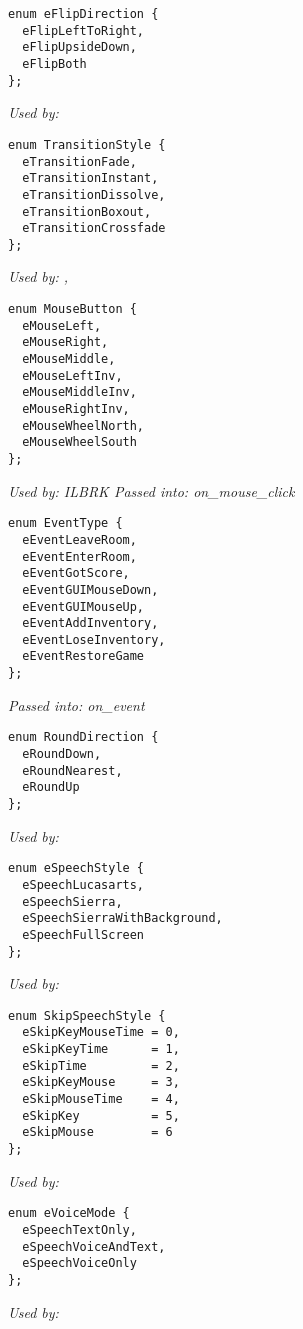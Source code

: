 \begin{verbatim}
enum eFlipDirection {
  eFlipLeftToRight,
  eFlipUpsideDown,
  eFlipBoth
};
\end{verbatim}
\it{Used by:} 

\begin{verbatim}
enum TransitionStyle {
  eTransitionFade,
  eTransitionInstant,
  eTransitionDissolve,
  eTransitionBoxout,
  eTransitionCrossfade
};
\end{verbatim}
\it{Used by:} ,

\begin{verbatim}
enum MouseButton {
  eMouseLeft,
  eMouseRight,
  eMouseMiddle,
  eMouseLeftInv,
  eMouseMiddleInv,
  eMouseRightInv,
  eMouseWheelNorth,
  eMouseWheelSouth
};
\end{verbatim}
\it{Used by:}  ILBRK
\it{Passed into:} on_mouse_click

\begin{verbatim}
enum EventType {
  eEventLeaveRoom,
  eEventEnterRoom,
  eEventGotScore,
  eEventGUIMouseDown,
  eEventGUIMouseUp,
  eEventAddInventory,
  eEventLoseInventory,
  eEventRestoreGame
};
\end{verbatim}
\it{Passed into:} on_event

\begin{verbatim}
enum RoundDirection {
  eRoundDown,
  eRoundNearest,
  eRoundUp
};
\end{verbatim}
\it{Used by:} 

\begin{verbatim}
enum eSpeechStyle {
  eSpeechLucasarts,
  eSpeechSierra,
  eSpeechSierraWithBackground,
  eSpeechFullScreen
};
\end{verbatim}
\it{Used by:} 

\begin{verbatim}
enum SkipSpeechStyle {
  eSkipKeyMouseTime = 0,
  eSkipKeyTime      = 1,
  eSkipTime         = 2,
  eSkipKeyMouse     = 3,
  eSkipMouseTime    = 4,
  eSkipKey          = 5,
  eSkipMouse        = 6
};
\end{verbatim}
\it{Used by:} 

\begin{verbatim}
enum eVoiceMode {
  eSpeechTextOnly,
  eSpeechVoiceAndText,
  eSpeechVoiceOnly
};
\end{verbatim}
\it{Used by:} 

